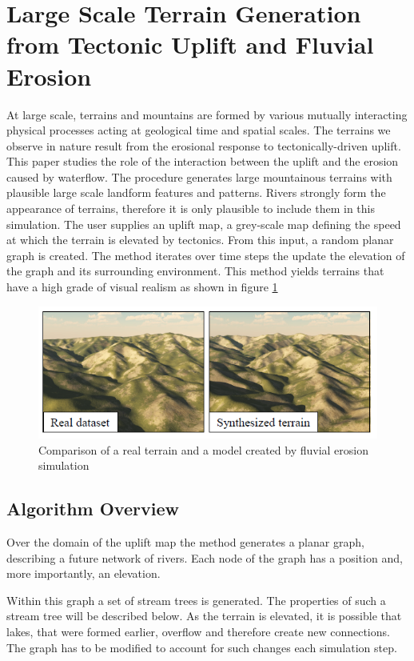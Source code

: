 \section{Large Scale Terrain Generation from Tectonic Uplift and Fluvial Erosion}
At large scale, terrains and mountains are formed by various mutually interacting physical processes acting at geological time and spatial scales. The terrains we observe in nature result from the erosional response to tectonically-driven uplift. This paper\cite{cordonnier2016large} studies the role of the interaction between the uplift and the erosion caused by waterflow. The procedure generates large mountainous terrains with plausible large scale landform features and patterns. Rivers strongly form the appearance of terrains, therefore it is only plausible to include them in this simulation.
The user supplies an uplift map, a grey-scale map defining the speed at which the terrain is elevated by tectonics. From this input, a random planar graph is created. The method iterates over time steps the update the elevation of the graph and its surrounding environment. This method yields terrains that have a high grade of visual realism as shown in figure \ref{fig:visual_realism}

\begin{figure}[htb]	
	\centering
	\includegraphics[width=\linewidth]{cordonnier2016large/visual_realism}
	\caption{Comparison of a real terrain and a model created by fluvial erosion simulation}
	\label{fig:visual_realism}
\end{figure}

\subsection{Algorithm Overview}
Over the domain of the uplift map the method generates a planar graph, describing a future network of rivers. Each node of the graph has a position and, more importantly, an elevation. 

Within this graph a set of stream trees is generated. The properties of such a stream tree will be described below. As the terrain is elevated, it is possible that lakes, that were formed earlier, overflow and therefore create new connections. The graph has to be modified to account for such changes each simulation step. 

